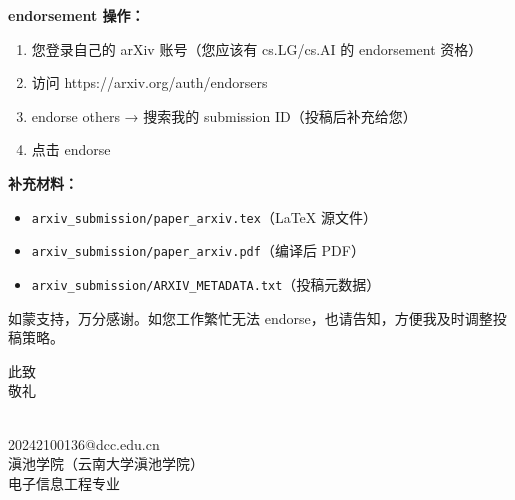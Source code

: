 \documentclass[11pt]{article}
\begin{document}
\vspace{0.2cm}

\noindent\textbf{endorsement 操作：}
\begin{enumerate}
\item 您登录自己的 arXiv 账号（您应该有 cs.LG/cs.AI 的 endorsement 资格）
\item 访问 https://arxiv.org/auth/endorsers
\item endorse others → 搜索我的 submission ID（投稿后补充给您）
\item 点击 endorse
\end{enumerate}

\vspace{0.2cm}

\noindent\textbf{补充材料：}
\begin{itemize}
\item \texttt{arxiv\_submission/paper\_arxiv.tex}（LaTeX 源文件）
\item \texttt{arxiv\_submission/paper\_arxiv.pdf}（编译后 PDF）
\item \texttt{arxiv\_submission/ARXIV\_METADATA.txt}（投稿元数据）
\end{itemize}

\vspace{0.2cm}

\noindent 如蒙支持，万分感谢。如您工作繁忙无法 endorse，也请告知，方便我及时调整投稿策略。

\vspace{0.3cm}

\noindent 此致 \\
敬礼

\vspace{0.3cm}

\noindent [你的名字] \\
20242100136@dcc.edu.cn \\
滇池学院（云南大学滇池学院） \\
电子信息工程专业
\end{document}
